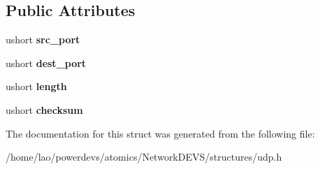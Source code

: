 \subsection*{Public Attributes}
\begin{DoxyCompactItemize}
\item 
ushort {\bfseries src\+\_\+port}\hypertarget{structudp_1_1Header_ae751d4065b7ffd06ca2aee668efaea93}{}\label{structudp_1_1Header_ae751d4065b7ffd06ca2aee668efaea93}

\item 
ushort {\bfseries dest\+\_\+port}\hypertarget{structudp_1_1Header_ac27f21b3a306cd9fbb82aa59183da569}{}\label{structudp_1_1Header_ac27f21b3a306cd9fbb82aa59183da569}

\item 
ushort {\bfseries length}\hypertarget{structudp_1_1Header_abb666da1f6ca9da00addcf288b79dabe}{}\label{structudp_1_1Header_abb666da1f6ca9da00addcf288b79dabe}

\item 
ushort {\bfseries checksum}\hypertarget{structudp_1_1Header_aeb4dde21af1f921c94c8fb1106dfbf05}{}\label{structudp_1_1Header_aeb4dde21af1f921c94c8fb1106dfbf05}

\end{DoxyCompactItemize}


The documentation for this struct was generated from the following file\+:\begin{DoxyCompactItemize}
\item 
/home/lao/powerdevs/atomics/\+Network\+D\+E\+V\+S/structures/udp.\+h\end{DoxyCompactItemize}
